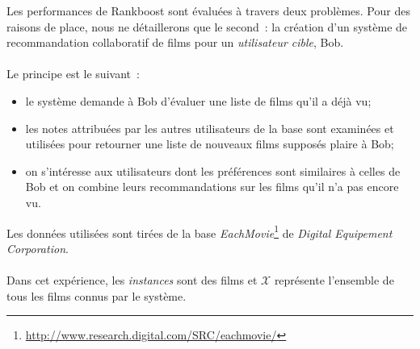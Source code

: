 \documentclass[pdftex,a4paper,11pt]{article}
\begin{document}
Les performances de Rankboost sont évaluées à travers deux problèmes. Pour des raisons de place, nous ne détaillerons que le second~:
%
la création d'un système de recommandation collaboratif de films pour un \emph{utilisateur cible}, Bob.%

\paragraph{}
Le principe est le suivant~:
\begin{itemize}
    \item le système demande à Bob d'évaluer une liste de films qu'il a déjà vu;
    \item les notes attribuées par les autres utilisateurs de la base sont examinées et utilisées pour retourner une liste de nouveaux films supposés plaire à Bob;
    \item on s'intéresse aux utilisateurs dont les préférences sont similaires à celles de Bob et on combine leurs recommandations sur les films qu'il n'a pas encore vu.
\end{itemize}
Les données utilisées sont tirées de la base \emph{EachMovie}\footnote{\url{http://www.research.digital.com/SRC/eachmovie/}} de \emph{Digital Equipement Corporation}.

\paragraph{}
Dans cet expérience, les \emph{instances} sont des films et $\mathcal{X}$ représente l'ensemble de tous les films connus par le système.
\end{document}
